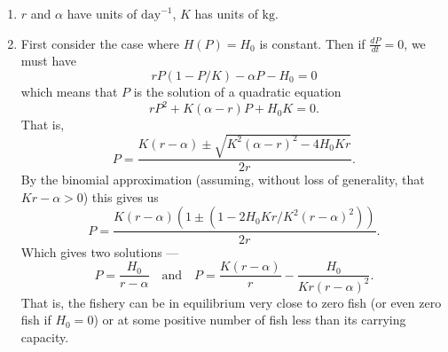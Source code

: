 \documentclass[12 pt, letterpaper]{hmcpset}
\begin{document}
\begin{solution}
	\begin{enumerate}
		\item $r$ and $\alpha$ have units of $\text{day}^{-1}$, $K$ has units of $\text{kg}$.
		\item First consider the case where $H(P) = H_{0}$ is constant. Then if $\frac{dP}{dt} = 0$, we must have
			\[
				rP(1 - P/K) - \alpha P - H_{0} = 0
			\]
			which means that $P$ is the solution of a quadratic equation
			\[
				r P^{2} + K(\alpha - r) P + H_{0} K = 0.
			\]
			That is,
			\[
				P = \frac{K (r - \alpha) \pm \sqrt{K^{2} (\alpha - r)^{2} - 4 H_{0} K r}}{2 r}. 
			\]
			By the binomial approximation (assuming, without loss of generality, that $Kr - \alpha > 0$) this gives us
			\[
				P = \frac{K(r - \alpha)(1 \pm (1 - 2 H_{0} K r/K^{2}(r - \alpha)^{2}))}{2 r}.
			\]
			Which gives two solutions ---
			\[
				P = \frac{H_{0}}{r - \alpha} \quad \text{and} \quad P = \frac{K(r - \alpha)}{r} - \frac{H_{0}}{K r(r - \alpha)^{2}}.
			\]
			That is, the fishery can be in equilibrium very close to zero fish (or even zero fish if $H_{0} = 0$) or at some positive number of fish less than its carrying capacity.
	\end{enumerate}
\end{solution}
\end{document}

